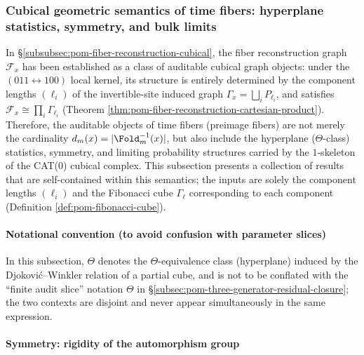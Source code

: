 \subsubsection{Cubical geometric semantics of time fibers: hyperplane statistics, symmetry, and bulk limits}\label{subsubsec:pom-fiber-cubical-hyperplane-symmetry-limit}
In \S\ref{subsubsec:pom-fiber-reconstruction-cubical}, the fiber reconstruction graph \(\mathcal F_x\) has been established as a class of auditable cubical graph objects:
under the \((011\leftrightarrow 100)\) local kernel, its structure is entirely determined by the component lengths \((\ell_i)\) of the invertible-site induced graph \(\Gamma_x=\bigsqcup_i P_{\ell_i}\),
and satisfies
\(
\mathcal F_x\cong\prod_i \Gamma_{\ell_i}
\)
(Theorem \ref{thm:pom-fiber-reconstruction-cartesian-product}).
Therefore, the auditable objects of time fibers (preimage fibers) are not merely the cardinality \(d_m(x)=|\Fold_m^{-1}(x)|\), but also include the hyperplane (\(\Theta\)-class) statistics, symmetry, and limiting probability structures carried by the \(1\)-skeleton of the CAT(0) cubical complex.
This subsection presents a collection of results that are self-contained within this semantics; the inputs are solely the component lengths \((\ell_i)\) and the Fibonacci cube \(\Gamma_{\ell}\) corresponding to each component (Definition \ref{def:pom-fibonacci-cube}).

\paragraph{Notational convention (to avoid confusion with parameter slices)}
In this subsection, \(\Theta\) denotes the \(\Theta\)-equivalence class (hyperplane) induced by the Djokovi\'c--Winkler relation of a partial cube,
and is not to be conflated with the ``finite audit slice'' notation \(\Theta\) in \S\ref{subsec:pom-three-generator-residual-closure}; the two contexts are disjoint and never appear simultaneously in the same expression.

\paragraph{Symmetry: rigidity of the automorphism group}

